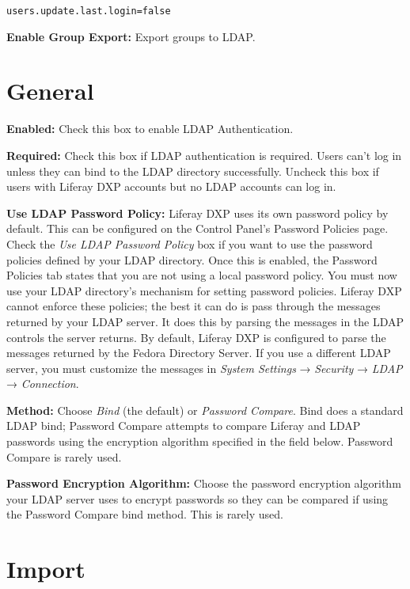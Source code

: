\begin{verbatim}
users.update.last.login=false
\end{verbatim}

\textbf{Enable Group Export:} Export groups to LDAP.

\section{General}\label{general}

\textbf{Enabled:} Check this box to enable LDAP Authentication.

\textbf{Required:} Check this box if LDAP authentication is required.
Users can't log in unless they can bind to the LDAP directory
successfully. Uncheck this box if users with Liferay DXP accounts but no
LDAP accounts can log in.

\textbf{Use LDAP Password Policy:} Liferay DXP uses its own password
policy by default. This can be configured on the Control Panel's
Password Policies page. Check the \emph{Use LDAP Password Policy} box if
you want to use the password policies defined by your LDAP directory.
Once this is enabled, the Password Policies tab states that you are not
using a local password policy. You must now use your LDAP directory's
mechanism for setting password policies. Liferay DXP cannot enforce
these policies; the best it can do is pass through the messages returned
by your LDAP server. It does this by parsing the messages in the LDAP
controls the server returns. By default, Liferay DXP is configured to
parse the messages returned by the Fedora Directory Server. If you use a
different LDAP server, you must customize the messages in \emph{System
Settings} → \emph{Security} → \emph{LDAP} → \emph{Connection}.

\textbf{Method:} Choose \emph{Bind} (the default) or \emph{Password
Compare}. Bind does a standard LDAP bind; Password Compare attempts to
compare Liferay and LDAP passwords using the encryption algorithm
specified in the field below. Password Compare is rarely used.

\textbf{Password Encryption Algorithm:} Choose the password encryption
algorithm your LDAP server uses to encrypt passwords so they can be
compared if using the Password Compare bind method. This is rarely used.

\section{Import}\label{import}


